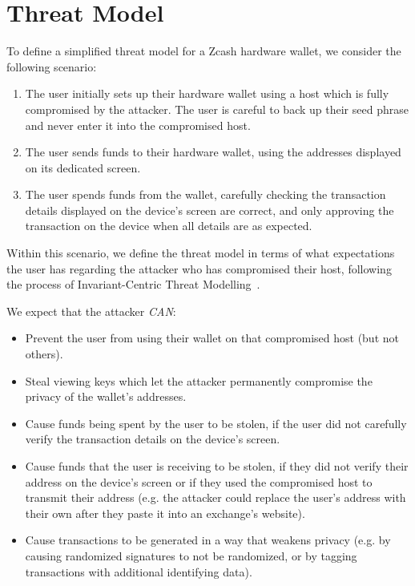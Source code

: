 \documentclass[10pt,titlepage]{article}
\begin{document}
\section{Threat Model} \label{secthreatmodel}
\renewcommand{\thesubsection}{\thesection.\arabic{subsection}}

To define a simplified threat model for a Zcash hardware wallet, we consider the
following scenario:

\begin{enumerate}
    \item The user initially sets up their hardware wallet using a host which is
    fully compromised by the attacker. The user is careful to back up their seed
    phrase and never enter it into the compromised host.
    \item The user sends funds to their hardware wallet, using the addresses
    displayed on its dedicated screen.
    \item The user spends funds from the wallet, carefully checking the
    transaction details displayed on the device's screen are correct, and only
    approving the transaction on the device when all details are as expected.
\end{enumerate}

Within this scenario, we define the threat model in terms of what expectations
the user has regarding the attacker who has compromised their host, following the process of Invariant-Centric Threat
Modelling~\cite{ictm}.

We expect that the attacker \emph{CAN}:

\begin{itemize}
    \item Prevent the user from using their wallet on that compromised host (but not others).
    \item Steal viewing keys which let the attacker permanently compromise the privacy of the wallet's addresses.
    \item Cause funds being spent by the user to be stolen, if the user did not
    carefully verify the transaction details on the device's screen.
    \item Cause funds that the user is receiving to be stolen, if they did not
    verify their address on the device's screen or if they used the compromised
    host to transmit their address (e.g. the attacker could replace the user's
    address with their own after they paste it into an exchange's website).
    \item Cause transactions to be generated in a way that weakens privacy (e.g.
    by causing randomized signatures to not be randomized, or by tagging
    transactions with additional identifying data).
\end{itemize}
\end{document}
